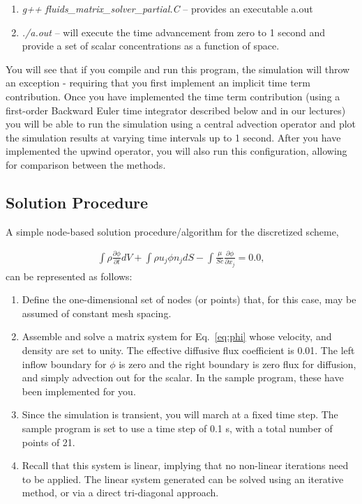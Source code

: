 \documentclass{article}
\begin{document}
\begin{enumerate}

\item \textit{g++ fluids\_matrix\_solver\_partial.C} -- provides an executable a.out
\item \textit{./a.out} -- will execute the time advancement from zero to 1 second and provide a set of scalar concentrations as a function of space.

\end{enumerate}

You will see that if you compile and run this program, the simulation will throw an exception - requiring that you first implement
an implicit time term contribution. Once you have implemented the time term contribution (using a first-order Backward Euler time integrator described below and in our lectures) you will be able to run the simulation using a central advection operator and plot the simulation results at varying time intervals up to 1 second. After you have implemented the upwind operator, you will also run this configuration, allowing for comparison between the methods. 

\subsection{Solution Procedure}
A simple node-based solution procedure/algorithm for the discretized scheme,

\begin{align}
  \int \rho \frac{\partial \phi}{\partial t} dV + \int \rho u_j \phi n_j dS - \int \frac{\mu}{Sc} \frac{\partial \phi}{\partial x_j} = 0.0,
  \label{eq:phi}
\end{align}
%
can be represented as follows:

\begin{enumerate}

\item Define the one-dimensional set of nodes (or points) that, for this case, may be assumed of constant mesh spacing. 
  
\item Assemble and solve a matrix system for Eq.~\ref{eq:phi} whose velocity, and density
  are set to unity. The effective diffusive flux coefficient is 0.01. The left inflow boundary for $\phi$ is zero and the right boundary is zero flux for diffusion, and simply
  advection out for the scalar. In the sample program, these have been implemented for you.

\item Since the simulation is transient, you will march at a fixed time step. The sample program is set to use a time step
  of 0.1 s, with a total number of points of 21. 
  
  \item Recall that this system is linear, implying that no non-linear iterations need to be applied. The linear system generated can be solved using an iterative method, or via a direct tri-diagonal approach.

\end{enumerate}
\end{document}
